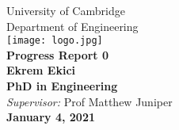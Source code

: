 \begin{titlepage}
	
	\begin{center}
		{\LARGE University of Cambridge}\\[1.5cm]
		{\Large Department of Engineering}\\[1.5cm]
		
		
		\texttt{[image: logo.jpg]}\\[1.618cm]
		
		
		\huge {\bfseries Progress Report 0}\\[2cm]
		{\Large\bf Ekrem Ekici}\\[0.5cm]
		{\large\bf PhD in Engineering}\\[1.618cm]
		{\large \emph{Supervisor:} Prof Matthew Juniper}\\[0.5cm]
		{\large\bf January 4, 2021}
		
	\end{center}
\newpage
\end{titlepage}
